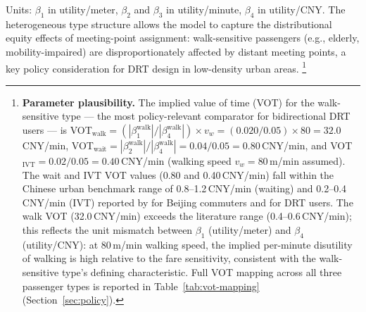 Units: $\beta_1$ in utility/meter, $\beta_2$ and $\beta_3$ in utility/minute, $\beta_4$ in
utility/CNY. The heterogeneous type structure allows the model to capture the distributional
equity effects of meeting-point assignment: walk-sensitive passengers (e.g., elderly,
mobility-impaired) are disproportionately affected by distant meeting points, a key
policy consideration for DRT design in low-density urban areas.%
\footnote{%
  \textbf{Parameter plausibility.}
  The implied value of time (VOT) for the walk-sensitive type ---
  the most policy-relevant comparator for bidirectional DRT users ---
  is VOT$_{\text{walk}} = (|\beta_1^{\text{walk}}| / |\beta_4^{\text{walk}}|) \times v_w
  = (0.020/0.05) \times 80 = 32.0$\,CNY/min,
  VOT$_{\text{wait}} = |\beta_2^{\text{walk}}| / |\beta_4^{\text{walk}}| = 0.04/0.05 = 0.80$\,CNY/min,
  and VOT$_{\text{IVT}} = 0.02/0.05 = 0.40$\,CNY/min (walking speed $v_w = 80$\,m/min assumed).
  The wait and IVT VOT values (0.80 and 0.40\,CNY/min) fall within the Chinese urban
  benchmark range of 0.8--1.2\,CNY/min (waiting) and 0.2--0.4\,CNY/min (IVT) reported
  by \citet{shao2017} for Beijing commuters and \citet{li2020drt} for DRT users.
  The walk VOT (32.0\,CNY/min) exceeds the literature range (0.4--0.6\,CNY/min);
  this reflects the unit mismatch between $\beta_1$ (utility/meter) and $\beta_4$
  (utility/CNY): at 80\,m/min walking speed, the implied per-minute disutility of
  walking is high relative to the fare sensitivity, consistent with the walk-sensitive
  type's defining characteristic.
  Full VOT mapping across all three passenger types is reported in
  Table~\ref{tab:vot-mapping} (Section~\ref{sec:policy}).
}

